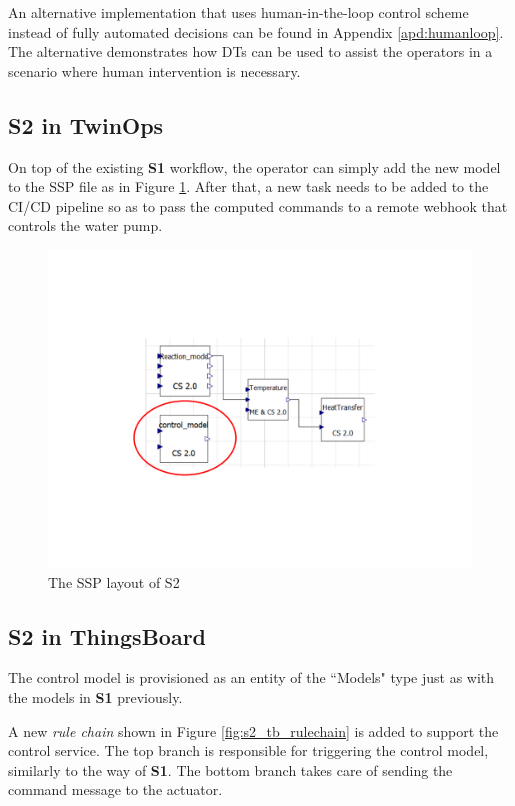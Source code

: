 An alternative implementation that uses human-in-the-loop control scheme instead of fully automated decisions can be found in Appendix \ref{apd:humanloop}. The alternative demonstrates how DTs can be used to assist the operators in a scenario where human intervention is necessary.  
  
\subsection{S2 in TwinOps} 
On top of the existing \textbf{S1} workflow, the operator can simply add the new model to the SSP file as in Figure \ref{fig:s2_twop_omedit}. After that, a new task needs to be added to the CI/CD pipeline so as to pass the computed commands to a remote webhook that controls the water pump.

\begin{figure}[hbt!]
  \centering
  \includegraphics[scale=0.4]{figures/s2_twop_omedit.pdf}
  \caption{The SSP layout of S2}
  \label{fig:s2_twop_omedit}
\end{figure}

\subsection{S2 in ThingsBoard} 
The control model is provisioned as an entity of the ``Models" type just as with the models in \textbf{S1} previously.

A new \textit{rule chain} shown in Figure \ref{fig:s2_tb_rulechain} is added to support the control service. The top branch is responsible for triggering the control model, similarly to the way of \textbf{S1}. The bottom branch takes care of sending the command message to the actuator. 

